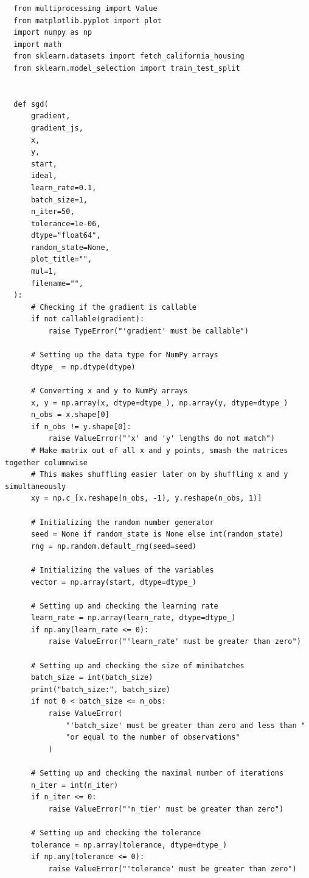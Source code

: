 \newpage
\begin{verbatim}  
  from multiprocessing import Value
  from matplotlib.pyplot import plot
  import numpy as np
  import math
  from sklearn.datasets import fetch_california_housing
  from sklearn.model_selection import train_test_split


  def sgd(
      gradient,
      gradient_js,
      x,
      y,
      start,
      ideal,
      learn_rate=0.1,
      batch_size=1,
      n_iter=50,
      tolerance=1e-06,
      dtype="float64",
      random_state=None,
      plot_title="",
      mul=1,
      filename="",
  ):
      # Checking if the gradient is callable
      if not callable(gradient):
          raise TypeError("'gradient' must be callable")

      # Setting up the data type for NumPy arrays
      dtype_ = np.dtype(dtype)

      # Converting x and y to NumPy arrays
      x, y = np.array(x, dtype=dtype_), np.array(y, dtype=dtype_)
      n_obs = x.shape[0]
      if n_obs != y.shape[0]:
          raise ValueError("'x' and 'y' lengths do not match")
      # Make matrix out of all x and y points, smash the matrices together columnwise
      # This makes shuffling easier later on by shuffling x and y simultaneously
      xy = np.c_[x.reshape(n_obs, -1), y.reshape(n_obs, 1)]

      # Initializing the random number generator
      seed = None if random_state is None else int(random_state)
      rng = np.random.default_rng(seed=seed)

      # Initializing the values of the variables
      vector = np.array(start, dtype=dtype_)

      # Setting up and checking the learning rate
      learn_rate = np.array(learn_rate, dtype=dtype_)
      if np.any(learn_rate <= 0):
          raise ValueError("'learn_rate' must be greater than zero")

      # Setting up and checking the size of minibatches
      batch_size = int(batch_size)
      print("batch_size:", batch_size)
      if not 0 < batch_size <= n_obs:
          raise ValueError(
              "'batch_size' must be greater than zero and less than "
              "or equal to the number of observations"
          )

      # Setting up and checking the maximal number of iterations
      n_iter = int(n_iter)
      if n_iter <= 0:
          raise ValueError("'n_tier' must be greater than zero")

      # Setting up and checking the tolerance
      tolerance = np.array(tolerance, dtype=dtype_)
      if np.any(tolerance <= 0):
          raise ValueError("'tolerance' must be greater than zero")


\end{verbatim}
